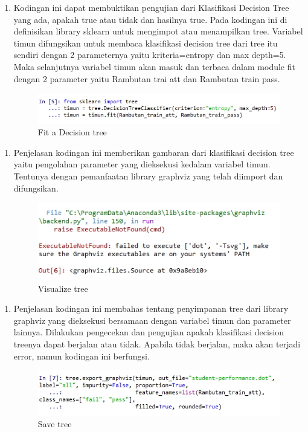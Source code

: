 \begin{enumerate}
\item Kodingan ini dapat membuktikan pengujian dari Klasifikasi Decision Tree yang ada, apakah true atau tidak dan hasilnya true. Pada kodingan ini di definisikan library sklearn untuk mengimpot atau menampilkan tree. Variabel timun difungsikan untuk membaca klasifikasi decision tree dari tree itu sendiri dengan 2 parameternya yaitu kriteria=entropy dan max depth=5. Maka selanjutnya variabel timun akan masuk dan terbaca dalam module fit dengan 2 parameter yaitu Rambutan trai att dan Rambutan train pass.
\begin{figure}[ht]
\centering
\includegraphics[scale=0.5]{figures/no5.png}
\caption{Fit a Decision tree}
\label{Hasil}
\end{figure}
\end{enumerate}

\begin{enumerate}
\item Penjelasan kodingan ini memberikan gambaran dari klasifikasi decision tree yaitu pengolahan parameter yang dieksekusi kedalam variabel timun. Tentunya dengan pemanfaatan library graphviz yang telah diimport dan difungsikan.
\begin{figure}[ht]
\centering
\includegraphics[scale=0.5]{figures/no6.png}
\caption{Visualize tree}
\label{Hasil}
\end{figure}
\end{enumerate}

\begin{enumerate}
\item Penjelasan kodingan ini membahas tentang penyimpanan tree dari library graphviz yang dieksekusi bersamaan dengan variabel timun dan parameter lainnya. Dilakukan pengecekan dan pengujian apakah klasifikasi decision treenya dapat berjalan atau tidak. Apabila tidak berjalan, maka akan terjadi error, namun kodingan ini berfungsi.
\begin{figure}[ht]
\centering
\includegraphics[scale=0.5]{figures/no7.png}
\caption{Save tree}
\label{Hasil}
\end{figure}
\end{enumerate}

